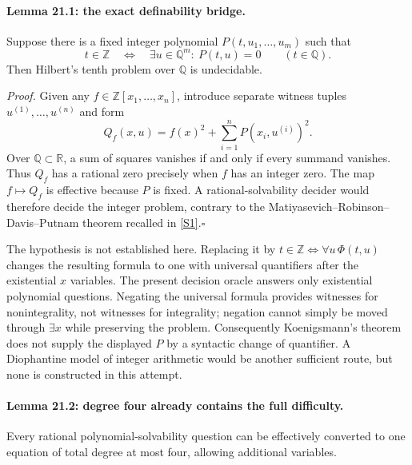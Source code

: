 \documentclass[11pt]{article}
\begin{document}
\paragraph{Lemma 21.1: the exact definability bridge.}
Suppose there is a fixed integer polynomial $P(t,u_1,\ldots,u_m)$ such that
\begin{equation}\label{cont21:integrality}
 t\in\mathbb Z\quad\Longleftrightarrow\quad
 \exists u\in\mathbb Q^m:\ P(t,u)=0
 \qquad(t\in\mathbb Q).
\end{equation}
Then Hilbert's tenth problem over $\mathbb Q$ is undecidable.

\emph{Proof.} Given any $f\in\mathbb Z[x_1,\ldots,x_n]$, introduce
separate witness tuples $u^{(1)},\ldots,u^{(n)}$ and form
\[
 Q_f(x,u)=f(x)^2+\sum_{i=1}^n P(x_i,u^{(i)})^2.
\]
Over $\mathbb Q\subset\mathbb R$, a sum of squares vanishes if and only
if every summand vanishes. Thus $Q_f$ has a rational zero precisely when
$f$ has an integer zero. The map $f\mapsto Q_f$ is effective because
$P$ is fixed. A rational-solvability decider would therefore decide the
integer problem, contrary to the Matiyasevich--Robinson--Davis--Putnam
theorem recalled in \href{https://arxiv.org/pdf/2309.14987}{[S1]}.\hfill$\square$

The hypothesis is not established here. Replacing it by
$t\in\mathbb Z\Longleftrightarrow\forall u\,\Phi(t,u)$ changes the
resulting formula to one with universal quantifiers after the existential
$x$ variables. The present decision oracle answers only existential
polynomial questions. Negating the universal formula provides witnesses
for nonintegrality, not witnesses for integrality; negation cannot simply
be moved through $\exists x$ while preserving the problem. Consequently
Koenigsmann's theorem does not supply the displayed $P$ by a syntactic
change of quantifier. A Diophantine model of integer arithmetic would be
another sufficient route, but none is constructed in this attempt.

\paragraph{Lemma 21.2: degree four already contains the full difficulty.}
Every rational polynomial-solvability question can be effectively converted
to one equation of total degree at most four, allowing additional variables.
\end{document}
